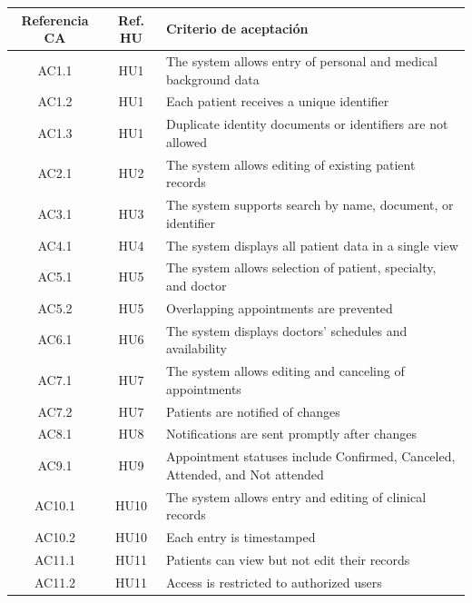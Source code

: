 \begin{longtable}{|c|c|p{9cm}|}
\hline
\textbf{Referencia CA} & \textbf{Ref. HU} & \textbf{Criterio de aceptación} \\
\hline

AC1.1 & HU1 & The system allows entry of personal and medical background data \\
\hline
AC1.2 & HU1 & Each patient receives a unique identifier \\
\hline
AC1.3 & HU1 & Duplicate identity documents or identifiers are not allowed \\
\hline

AC2.1 & HU2 & The system allows editing of existing patient records \\
\hline

AC3.1 & HU3 & The system supports search by name, document, or identifier \\
\hline

AC4.1 & HU4 & The system displays all patient data in a single view \\
\hline

AC5.1 & HU5 & The system allows selection of patient, specialty, and doctor \\
\hline
AC5.2 & HU5 & Overlapping appointments are prevented \\
\hline

AC6.1 & HU6 & The system displays doctors’ schedules and availability \\
\hline

AC7.1 & HU7 & The system allows editing and canceling of appointments \\
\hline
AC7.2 & HU7 & Patients are notified of changes \\
\hline

AC8.1 & HU8 & Notifications are sent promptly after changes \\
\hline

AC9.1 & HU9 & Appointment statuses include Confirmed, Canceled, Attended, and Not attended \\
\hline

AC10.1 & HU10 & The system allows entry and editing of clinical records \\
\hline
AC10.2 & HU10 & Each entry is timestamped \\
\hline

AC11.1 & HU11 & Patients can view but not edit their records \\
\hline
AC11.2 & HU11 & Access is restricted to authorized users \\
\hline


\end{longtable}
